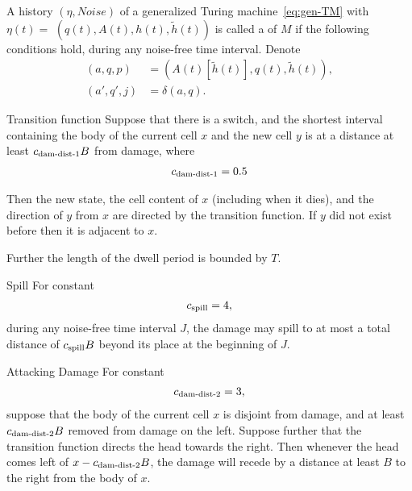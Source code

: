 \documentclass[12pt]{memoir}
\def\B{B}
\newcommand{\h}{h}
\newcommand{\hc}{\tilde h}
\newcommand{\Noise}{\mathit{Noise}}
\newcommand{\Tu}{T}
\newcommand{\cns}[1]{c_{\textrm{\upshape #1}}}
\newcommand{\cDamDist}[1]{\cns{dam-dist-#1}}
\newcommand{\cSpill}{\cns{spill}}
\begin{document}
\begin{definition}[Trajectory]\label{def:traj}
\begin{sloppypar}
   A history  \( (\eta, \Noise) \) of a generalized Turing 
machine~\eqref{eq:gen-TM} with \(\eta(t) =\)
\( (q(t), A(t), \h(t), \hc(t)) \)
is called a  of \( M \) if the following conditions hold, during any 
noise-free time interval.
Denote 
\begin{align*}
     (a, q, p) &= (A(t)[\hc(t)], q(t),\hc(t)),
\\ (a',q',j)   &= \delta(a,q).
 \end{align*}
  \end{sloppypar}
\begin{flushdescription}

\item[Transition function]\label{i:def.traj.transition}
Suppose that there is a switch, and the shortest interval
containing the body of the current cell \( x \) and the
new cell \( y \) is at a distance at least \( \cDamDist1 \B \)
from damage, where 
 \begin{align}\label{eq:cns.dam-dist-1}
  \cDamDist1 =0.5
 \end{align}

Then the new state, the cell content of \( x \) (including when it dies), and
the direction of \( y \) from \( x \) are directed by the transition function.
If \( y \) did not exist before then it is adjacent to \( x \).

Further the length of the dwell period is bounded by \( \Tu \).


\item[Spill]\label{i:bound-on-damage}
For constant
\begin{align}\label{eq:cns.spill}
   \cSpill =4,
 \end{align}
during any noise-free time interval \( J \), 
the damage may spill to at most a total distance of \( \cSpill \B \) beyond its 
place at the beginning of \( J \).

\item[Attacking Damage] \label{i:def.traj.attack-from-outside}
For constant
\begin{align}\label{eq:cns.dam-dist-2}
   \cDamDist2 =3,
 \end{align}
suppose that the body of the current cell \( x \) is disjoint from damage, 
and at least \( \cDamDist2 \B \) removed from damage on the left.
Suppose further that the transition function directs the head towards the right.
Then whenever the head comes left  of \( x-\cDamDist2 \B \), the  
damage will recede by a distance at least \( \B \) to the right from the body of \( x \).


\end{flushdescription}
\end{definition}
\end{document}
